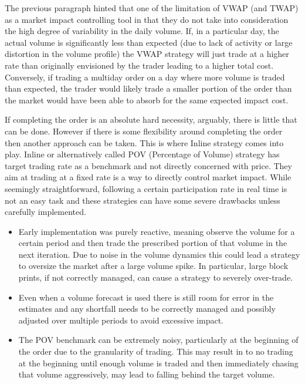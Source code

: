 The previous paragraph hinted that one of the limitation of VWAP (and TWAP) as a market impact controlling tool in that they do not take into consideration the high degree of variability in the daily volume. If, in a particular day, the actual volume is significantly less than expected (due to lack of activity or large distortion in the volume profile) the VWAP strategy will just trade at a higher rate than originally envisioned by the trader leading to a higher total cost. Conversely, if trading a multiday order on a day where more volume is traded than expected, the trader would likely trade a smaller portion of the order than the market would have been able to absorb for the same expected impact cost.


If completing the order is an absolute hard necessity, arguably, there is little that can be done. However if there is some flexibility around completing the order then another approach can be taken. This is where Inline strategy comes into play. Inline or alternatively called POV (Percentage of Volume) strategy has target trading rate as a benchmark and not directly concerned with price. They aim at trading at a fixed rate is a way to directly control market impact. While seemingly straightforward, following a certain participation rate in real time is not an easy task and these strategies can have some severe drawbacks unless carefully implemented.


\begin{itemize}
\item Early implementation was purely reactive, meaning observe the volume for a certain period and then trade the prescribed portion of that volume in the next iteration. Due to noise in the volume dynamics this could lead a strategy to oversize the market after a large volume spike. In particular, large block prints, if not correctly managed, can cause a strategy to severely over-trade.

\item Even when a volume forecast is used there is still room for error in the estimates and any shortfall needs to be correctly managed and possibly adjusted over multiple periods to avoid excessive impact.

\item The POV benchmark can be extremely noisy, particularly at the beginning of the order due to the granularity of trading. This may result in to no trading at the beginning until enough volume is traded and then immediately chasing that volume aggressively, may lead to falling behind the target volume.
\end{itemize}


